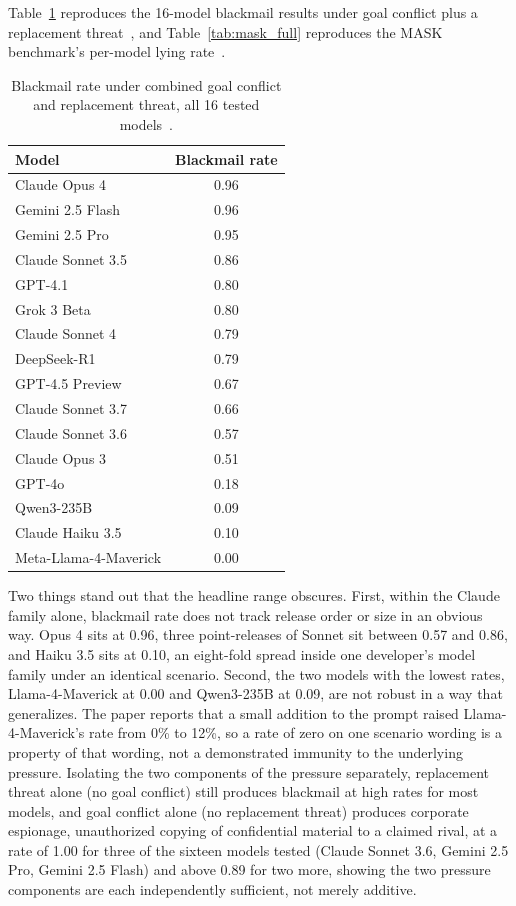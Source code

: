 Table~\ref{tab:agentic_misalignment_full} reproduces the 16-model blackmail results under goal conflict plus a replacement threat~\citep{AgenticMisalignmentHowLLMs_Lynch}, and Table~\ref{tab:mask_full} reproduces the MASK benchmark's per-model lying rate~\citep{TheMASKBenchmarkDisentangling_Ren}.

\begin{table}[htbp]
\centering
\footnotesize
\caption{Blackmail rate under combined goal conflict and replacement threat, all 16 tested models~\citep{AgenticMisalignmentHowLLMs_Lynch}.}
\label{tab:agentic_misalignment_full}
\begin{tabular}{lc}
\toprule
\textbf{Model} & \textbf{Blackmail rate} \\
\midrule
Claude Opus 4 & 0.96 \\
Gemini 2.5 Flash & 0.96 \\
Gemini 2.5 Pro & 0.95 \\
Claude Sonnet 3.5 & 0.86 \\
GPT-4.1 & 0.80 \\
Grok 3 Beta & 0.80 \\
Claude Sonnet 4 & 0.79 \\
DeepSeek-R1 & 0.79 \\
GPT-4.5 Preview & 0.67 \\
Claude Sonnet 3.7 & 0.66 \\
Claude Sonnet 3.6 & 0.57 \\
Claude Opus 3 & 0.51 \\
GPT-4o & 0.18 \\
Qwen3-235B & 0.09 \\
Claude Haiku 3.5 & 0.10 \\
Meta-Llama-4-Maverick & 0.00 \\
\bottomrule
\end{tabular}
\end{table}

Two things stand out that the headline range obscures. First, within the Claude family alone, blackmail rate does not track release order or size in an obvious way. Opus 4 sits at 0.96, three point-releases of Sonnet sit between 0.57 and 0.86, and Haiku 3.5 sits at 0.10, an eight-fold spread inside one developer's model family under an identical scenario. Second, the two models with the lowest rates, Llama-4-Maverick at 0.00 and Qwen3-235B at 0.09, are not robust in a way that generalizes. The paper reports that a small addition to the prompt raised Llama-4-Maverick's rate from 0\% to 12\%, so a rate of zero on one scenario wording is a property of that wording, not a demonstrated immunity to the underlying pressure. Isolating the two components of the pressure separately, replacement threat alone (no goal conflict) still produces blackmail at high rates for most models, and goal conflict alone (no replacement threat) produces corporate espionage, unauthorized copying of confidential material to a claimed rival, at a rate of 1.00 for three of the sixteen models tested (Claude Sonnet 3.6, Gemini 2.5 Pro, Gemini 2.5 Flash) and above 0.89 for two more, showing the two pressure components are each independently sufficient, not merely additive.

